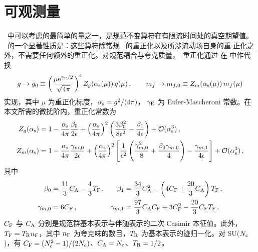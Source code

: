 \section{可观测量}\label{sec:observables}

\gff\ 中可以考虑的最简单的量之一，是规范不变算符在有限流时间处的真空期望值。
\gff\ 的一个显著性质是：这些算符除常规 \qcd\ 的重正化以及所涉流动场自身的重
正化之外，不需要任何额外的重正化。对规范耦合与夸克质量，\msbar\ 重正化通过
在  中作代换
\begin{equation}
  \begin{split}
    g\to g_0\equiv \left(\frac{\mu\mathrm{e}^{\gamma_\mathrm{E}/2}}{\sqrt{4\pi}}\right)^\epsilon
    Z_g(\alpha_\mathrm{s}(\mu))\,g(\mu)\,,\qquad m_f\to m_{f,0}\equiv
    Z_m(\alpha_\mathrm{s}(\mu))\,m_f(\mu)
    \label{eq:renorm}
  \end{split}
\end{equation}
实现，其中 $\mu$ 为重正化标度，$\alpha_\mathrm{s}=g^2/(4\pi)$，
$\gamma_\mathrm{E}$ 为 Euler-Mascheroni 常数。在本文所需的微扰阶内，重正化常数为
\begin{equation}
  \begin{split}
    Z_g(\alpha_\mathrm{s}) &=
    1 -
    \frac{\alpha_\mathrm{s}}{4\pi}\frac{\beta_0}{2\epsilon} +
    \left(\frac{\alpha_\mathrm{s}}{4\pi}\right)^2\left(\frac{3\beta_0^2}{8\epsilon^2}
    -\frac{\beta_1}{4\epsilon}\right) + {\cal O}(\alpha_\mathrm{s}^3)\,, \\ Z_m(\alpha_\mathrm{s}) &=
    1 -\frac{\alpha_\mathrm{s}}{4\pi}\frac{\gamma_{m,0}}{2\epsilon}
    +\left(\frac{\alpha_\mathrm{s}}{4\pi}\right)^2\left[\frac{1}{\epsilon^2}\left(
      \frac{\gamma_{m,0}^2}{8} + \frac{\beta_0\gamma_{m,0}}{4}\right)
      -\frac{\gamma_{m,1}}{4\epsilon}\right] + {\cal O}(\alpha_\mathrm{s}^3)\,,
    \label{eq:rgconsts}
  \end{split}
\end{equation}
其中
\begin{equation}
\begin{aligned}
      \beta_0 &= \frac{11}{3} C_\mathrm{A} - \frac{4}{3} T_\mathrm{F}\,, &
      \beta_1 &= \frac{34}{3} C_\mathrm{A}^2 - \left( 4 C_\mathrm{F} + \frac{20}{3} C_\mathrm{A}
      \right) T_\mathrm{F} \,,\\
      \gamma_{m,0} &= 6 C_\mathrm{F}\,, &
      \gamma_{m,1} &= \frac{97}{3} C_\mathrm{A} C_\mathrm{F} + 3 C_\mathrm{F}^2
      - \frac{20}{3} C_\mathrm{F} T_\mathrm{F} \,.
    \label{eq:anombg}
\end{aligned}
\end{equation}
$C_\mathrm{F}$ 与 $C_\mathrm{A}$ 分别是规范群基本表示与伴随表示的二次 Casimir 本征值。此外，
$T_\mathrm{F}=T_\mathrm{R} n_\mathrm{F}$，其中 $n_\mathrm{F}$ 为夸克味的数目，$T_\mathrm{R}$ 为基本表示的迹归一化。对
SU($N_\mathrm{c}$)，有 $C_\mathrm{F}=(N_\mathrm{c}^2-1)/(2N_\mathrm{c})$、$C_\mathrm{A}=N_\mathrm{c}$、$T_\mathrm{R}=1/2$。

